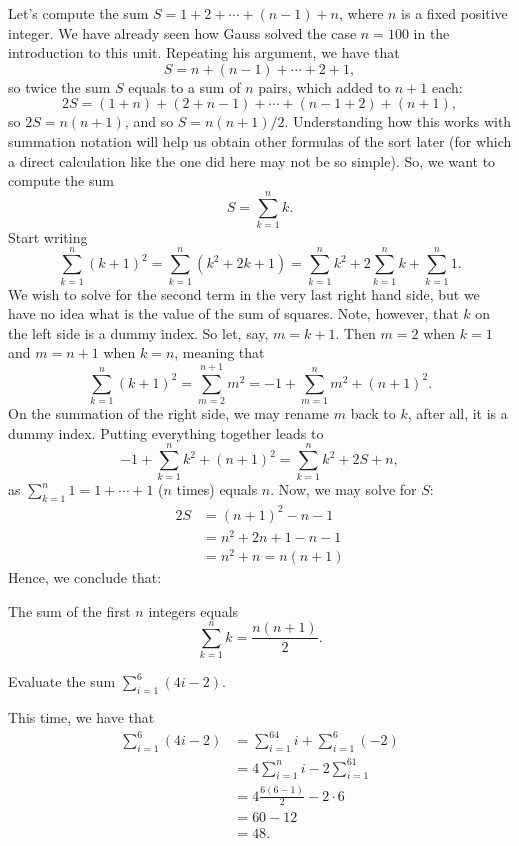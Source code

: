 \documentclass[nooutcomes]{ximera}
\begin{document}
Let's compute the sum $S = 1+2+\cdots +(n-1)+ n$, where $n$ is a fixed positive integer. We have already seen how Gauss solved the case $n=100$ in the introduction to this unit. Repeating his argument, we have that $$S = n + (n-1)+\cdots +2+1,$$so twice the sum $S$ equals to a sum of $n$ pairs, which added to $n+1$ each: $$2S = (1+n) + (2+n-1)+\cdots + (n-1+2) + (n+1),$$so $2S = n(n+1)$, and so $S = n(n+1)/2$. Understanding how this works with summation notation will help us obtain other formulas of the sort later (for which a direct calculation like the one did here may not be so simple). So, we want to compute the sum $$S = \sum_{k=1}^n k.$$Start writing$$\sum_{k=1}^n (k+1)^2 = \sum_{k=1}^n (k^2 + 2k+1) = \sum_{k=1}^n k^2 + 2\sum_{k=1}^n k + \sum_{k=1}^n 1.$$We wish to solve for the second term in the very last right hand side, but we have no idea what is the value of the sum of squares. Note, however, that $k$ on the left side is a dummy index. So let, say, $m=k+1$. Then $m=2$ when $k=1$ and $m=n+1$ when $k=n$, meaning that $$\sum_{k=1}^n(k+1)^2 = \sum_{m=2}^{n+1} m^2 = -1 + \sum_{m=1}^n m^2 + (n+1)^2.$$On the summation of the right side, we may rename $m$ back to $k$, after all, it is a dummy index. Putting everything together leads to $$-1+\sum_{k=1}^nk^2+(n+1)^2 = \sum_{k=1}^n k^2+2S+n,$$as $\sum_{k=1}^n 1=1+\cdots + 1$ ($n$ times) equals $n$. Now, we may solve for $S$:
\begin{align*} 2S &= (n+1)^2-n-1 \\ &= n^2+2n+1-n-1 \\ &= n^2+n =n(n+1)\end{align*}Hence, we conclude that:
\begin{callout}
The sum of the first $n$ integers equals $$\sum_{k=1}^n k = \frac{n(n+1)}{2}.$$  
\end{callout}

\begin{example}
  Evaluate the sum $\sum_{i=1}^6 (4i-2)$.

  \begin{explanation}
  This time, we have that
  \begin{align*}
    \sum_{i=1}^6 (4i-2) &= \sum_{i=1}^64i + \sum_{i=1}^6(-2) \\ &= 4\sum_{i=1}^ni - 2\sum_{i=1}^61 \\ &= 4\frac{6(6-1)}{2} - 2\cdot 6 \\ &= 60-12 \\ &= 48.
  \end{align*}
  \end{explanation}
\end{example}
\end{document}
